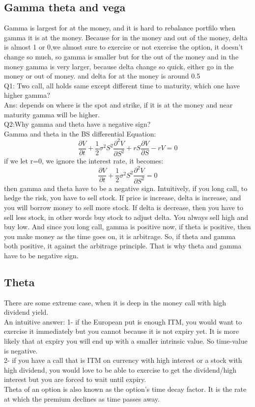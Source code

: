 \documentclass[a4paper,11pt]{article}
\begin{document}
\subsection{Gamma theta and vega}
Gamma is largest for at the money, and it is hard to rebalance portfilo when gamma it is at the money. Because for in the money and out of the money, delta is almost 1 or 0,we almost sure to exercise or not exercise the option, it doesn't change so much, so gamma is smaller but for the out of the money and in the money gamma is very larger, because delta change so quick, either go in the money or out of money. and delta for at the money is around 0.5\\
Q1: Two call, all holds same except different time to maturity, which one have higher gamma?\\
Ans: depends on where is the spot and strike, if it is at the money and near maturity gamma will be higher.\\
Q2:Why gamma and theta have a negative sign?\\
Gamma and theta in the BS differential Equation:\\
$$
\frac{\partial V}{\partial t} + \frac{1}{2}\sigma^2 S^2 \frac{\partial^2 V}{\partial S^2} + rS\frac{\partial V}{\partial S} - rV = 0
$$
if we let r=0, we ignore the interest rate, it becomes:\\
$$
\frac{\partial V}{\partial t} + \frac{1}{2}\sigma^2 S^2 \frac{\partial^2 V}{\partial S^2}  = 0
$$
then gamma and theta have to be a negative sign. Intuitively, if you long call, to hedge the risk, you have to sell stock. If price is increase, delta is increase, and you will borrow money to sell more stock. If delta is decrease, then you have to sell less stock, in other words buy stock to adjust delta. You always sell high and buy low. And since you long call, gamma is positive now, if theta is positive, then you make money as the time goes on, it is arbitrage. So, if theta and gamma both positive, it against the arbitrage principle. That is why theta and gamma have to be negative sign.\\
\subsection{Theta}
There are some extreme case, when it is deep in the money call with high dividend yield.\\
An intuitive answer:
1- if the European put is enough ITM, you would want to exercise it immediately but you cannot because it is not expiry yet. It is more likely that at expiry you will end up with a smaller intrinsic value. So time-value is negative.\\
2- if you have a call that is ITM on currency with high interest or a stock with high dividend, you would love to be able to exercise to get the dividend/high interest but you are forced to wait until expiry.\\
 Theta of an option is also known as the option's time decay factor. It is the rate at which the premium declines as time passes away.\\
\end{document}
